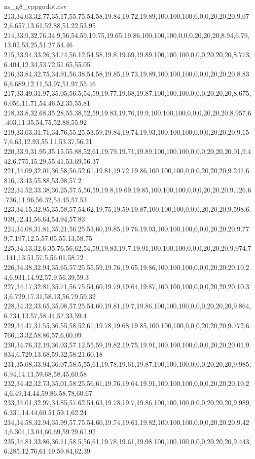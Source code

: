 \begin{filecontents*}[overwrite]{ns_g8_cppgodot.csv}
213,34.03,32.77,35.17,55.75,54,58,19.84,19.72,19.89,100,100,100,0,0,0,20,20,20,9.072,6.657,13.61,52.88,51.22,53.95
214,33.9,32.76,34.9,56,54,59,19.75,19.65,19.86,100,100,100,0,0,0,20,20,20,8.94,6.79,13.02,53.25,51.27,54.46
215,33.94,33.26,34.74,56.12,54,58,19.8,19.69,19.89,100,100,100,0,0,0,20,20,20,8.773,6.404,12.34,53.72,51.65,55.05
216,33.84,32.75,34.91,56.38,54,58,19.85,19.73,19.89,100,100,100,0,0,0,20,20,20,8.836,6.689,12.11,53.97,51.97,55.46
217,33.49,31.97,35.05,56.5,54,59,19.77,19.68,19.87,100,100,100,0,0,0,20,20,20,8.675,6.056,11.71,54.46,52.35,55.81
218,33.8,32.68,35.28,55.38,52,59,19.83,19.76,19.9,100,100,100,0,0,0,20,20,20,8.957,6.403,11.35,54.75,52.88,55.92
219,33.63,31.71,34.76,55.25,53,59,19.84,19.74,19.93,100,100,100,0,0,0,20,20,20,9.157,6.63,12.93,55.11,53.37,56.21
220,33.9,31.95,35.15,55.88,52,61,19.79,19.71,19.89,100,100,100,0,0,0,20,20,20.01,9.442,6.775,15.29,55.41,53.69,56.37
221,34.09,32.01,36.58,56,52,61,19.81,19.72,19.86,100,100,100,0,0,0,20,20,20,9.241,6.816,13.43,55.88,53.98,57.2
222,34.52,33.38,36.25,57.5,56,59,19.8,19.69,19.85,100,100,100,0,0,0,20,20,20,9.126,6.736,11.96,56.32,54.45,57.53
223,34.15,32.95,35.58,57,54,62,19.75,19.59,19.87,100,100,100,0,0,0,20,20,20,9.598,6.939,12.41,56.64,54.94,57.83
224,34.08,31.81,35.21,56.25,53,60,19.85,19.76,19.93,100,100,100,0,0,0,20,20,20,9.779,7.197,12.5,57.05,55.13,58.75
225,34.13,32.6,35.76,56.62,54,59,19.83,19.7,19.91,100,100,100,0,0,0,20,20,20,9.974,7.141,13.51,57.5,56.01,58.72
226,34.38,32.94,35.65,57.25,55,59,19.76,19.65,19.86,100,100,100,0,0,0,20,20,20,10.24,6.931,14.92,57.9,56.39,59.3
227,34.17,32.81,35.71,56.75,54,60,19.79,19.64,19.87,100,100,100,0,0,0,20,20,20,10.33,6.729,17.31,58.13,56.79,59.32
228,34.32,33.65,35.08,57.25,54,60,19.81,19.7,19.86,100,100,100,0,0,0,20,20,20,9.864,6.734,13.57,58.44,57.33,59.4
229,34.47,31.55,36.55,58,52,61,19.78,19.68,19.85,100,100,100,0,0,0,20,20,20,9.772,6.766,13.32,58.86,57.6,60.09
230,34.76,32.19,36.03,57.12,55,59,19.82,19.75,19.91,100,100,100,0,0,0,20,20,20.01,9.834,6.729,13.68,59.32,58.21,60.18
231,35.08,33.94,36.07,58.5,55,61,19.78,19.61,19.87,100,100,100,0,0,0,20,20,20,9.985,6.94,14.11,59.68,58.45,60.58
232,34.42,32.73,35.01,58.25,56,61,19.76,19.64,19.91,100,100,100,0,0,0,20,20,20,10.24,6.49,14.44,59.86,58.78,60.67
233,34.01,32.97,34.85,57.62,54,63,19.78,19.7,19.86,100,100,100,0,0,0,20,20,20,9.989,6.331,14.44,60.51,59.1,62.24
234,34.58,32.94,35.99,57.75,54,60,19.74,19.61,19.82,100,100,100,0,0,0,20,20,20,9.424,6.304,13.04,60.69,59.29,61.92
235,34.81,33.86,36.11,58.5,56,61,19.78,19.61,19.98,100,100,100,0,0,0,20,20,20,9.443,6.285,12.76,61.19,59.84,62.39

\end{filecontents*}
